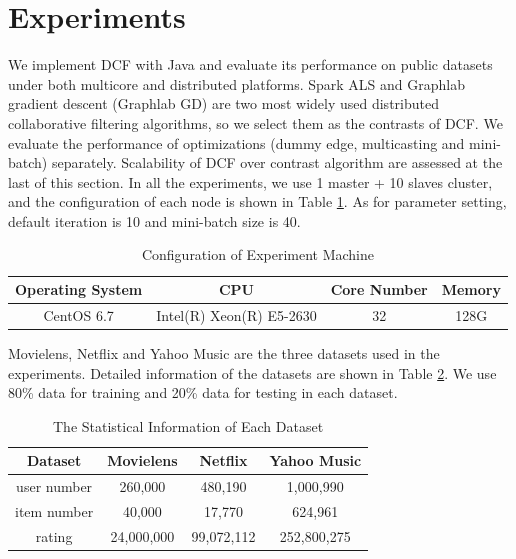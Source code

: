 \documentclass{llncs}
\begin{document}
\section{Experiments}
\label{sec:experiment}
\vspace{-5pt}


We implement DCF with Java and evaluate its performance on public datasets under both multicore and distributed platforms. Spark ALS \cite{SparkMllib} and Graphlab \cite{graphlab} gradient descent (Graphlab GD) are two most widely used distributed collaborative filtering algorithms, so we select them as the contrasts of DCF. We evaluate the performance of optimizations (dummy edge, multicasting and mini-batch) separately. Scalability of DCF over contrast algorithm are assessed at the last of this section. In all the experiments, we use 1 master + 10 slaves cluster, and the configuration of each node is shown in Table \ref{tab:cluster}. As for parameter setting, default iteration is 10 and mini-batch size is 40.
\vspace{-15pt}

\begin{table}[!htb]
\renewcommand{\arraystretch}{1.3}
\caption{Configuration of Experiment Machine}
\label{tab:cluster}
\centering
\begin{tabular}{|c|c|c|c|}
\hline
Operating System & CPU & Core Number & Memory\\
\hline
CentOS 6.7 & Intel(R) Xeon(R) E5-2630 & 32 & 128G\\
\hline
\end{tabular}
\vspace{-15pt}
\end{table}

Movielens, Netflix and Yahoo Music are the three datasets used in the experiments. Detailed information of the datasets are shown in Table \ref{tab:dataset}. We use 80\% data for training and 20\% data for testing in each dataset.

\vspace{-10pt}
\begin{table}[!htb]
\renewcommand{\arraystretch}{1.3}
\caption{The Statistical Information of Each Dataset}
\label{tab:dataset}
\centering
\begin{tabular}{|c|c|c|c|}
\hline
\textbf{Dataset} & Movielens & Netflix & Yahoo Music\\
\hline
user number & 260,000 & 480,190 & 1,000,990\\
\hline
item number & 40,000 & 17,770 & 624,961\\
\hline
rating & 24,000,000 & 99,072,112 & 252,800,275\\
\hline
\end{tabular}
\vspace{-30pt}
\end{table}
\end{document}

